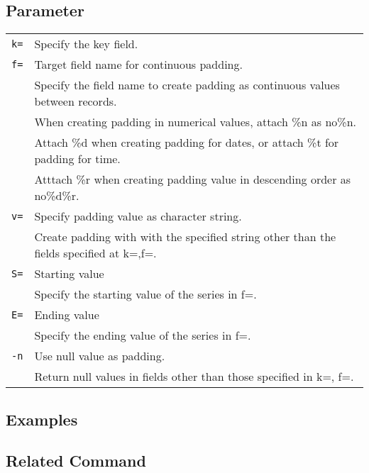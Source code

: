 \subsection*{Parameter}
\begin{table}[htbp]
{\small
\begin{tabular}{ll}
\verb|k=|    & Specify the key field. \\
\verb|f=|    & Target field name for continuous padding. \\
             & Specify the field name to create padding as continuous values between records. \\
             	 & When creating padding in numerical values, attach \%n as no\%n.\\
	 	& Attach \%d when creating padding for dates, or attach \%t for padding for time. \\
	 & Atttach \%r when creating padding value in descending order as no\%d\%r.\\
	 			 
          
\verb|v=|    & Specify padding value as character string.\\
             & Create padding with with the specified string other than the fields specified at k=,f=. \\
\verb|S=|    & Starting value\\
             & Specify the starting value of the series in f=.\\
\verb|E=|    & Ending value\\
             & Specify the ending value of the series in f=.\\
\verb|-n|    & Use null value as padding.\\
             & Return null values in fields other than those specified in k=, f=.\\
\end{tabular} 
}
\end{table} 

\subsection*{Examples}


\subsection*{Related Command}

%
